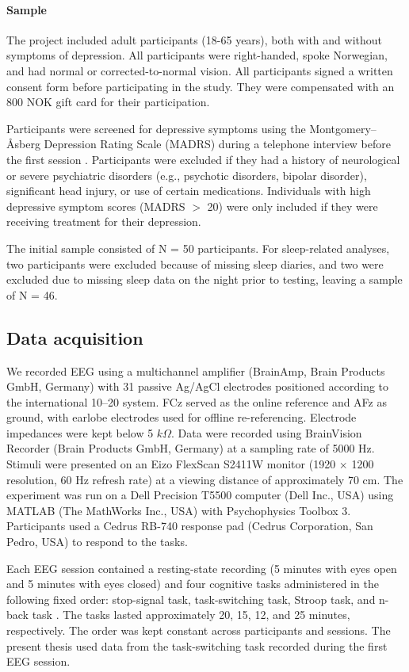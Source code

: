 \documentclass[12pt,a4paper]{report}
\begin{document}
\paragraph{Sample}
The project included adult participants (18-65 years), both with and without symptoms of depression. All participants were right-handed, spoke Norwegian, and had normal or corrected-to-normal vision. All participants signed a written consent form before participating in the study. They were compensated with an 800 NOK gift card for their participation.

Participants were screened for depressive symptoms using the Montgomery–Åsberg Depression Rating Scale (MADRS) during a telephone interview before the first session \parencite{montgomery1979madrs}. Participants were excluded if they had a history of neurological or severe psychiatric disorders (e.g., psychotic disorders, bipolar disorder), significant head injury, or use of certain medications. Individuals with high depressive symptom scores (MADRS $>$ 20) were only included if they were receiving treatment for their depression.

The initial sample consisted of N = 50 participants. For sleep-related analyses, two participants were excluded because of missing sleep diaries, and two were excluded due to missing sleep data on the night prior to testing, leaving a sample of N = 46.


\subsection{Data acquisition}

We recorded EEG using a multichannel amplifier (BrainAmp, Brain Products GmbH, Germany) with 31 passive Ag/AgCl electrodes positioned according to the international 10–20 system. FCz served as the online reference and AFz as ground, with earlobe electrodes used for offline re-referencing. Electrode impedances were kept below 5 $k\Omega$. Data were recorded using BrainVision Recorder (Brain Products GmbH, Germany) at a sampling rate of 5000 Hz. Stimuli were presented on an Eizo FlexScan S2411W monitor (1920 \(\times\) 1200 resolution, 60 Hz refresh rate) at a viewing distance of approximately 70 cm. The experiment was run on a Dell Precision T5500 computer (Dell Inc., USA) using MATLAB (The MathWorks Inc., USA) with Psychophysics Toolbox 3. Participants used a Cedrus RB-740 response pad (Cedrus Corporation, San Pedro, USA) to respond to the tasks.

Each EEG session contained a resting-state recording (5 minutes with eyes open and 5 minutes with eyes closed) and four cognitive tasks administered in the following fixed order: stop-signal task, task-switching task, Stroop task, and n-back task \parencite{logan1984inhibition, rogers1995taskswitch, stroop1935interference, kirchner1958update}. The tasks lasted approximately 20, 15, 12, and 25 minutes, respectively. The order was kept constant across participants and sessions. The present thesis used data from the task-switching task recorded during the first EEG session.
\end{document}
